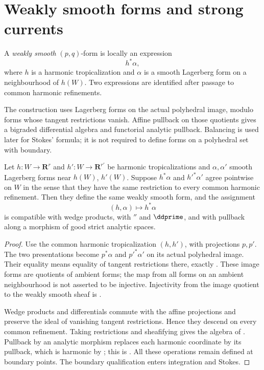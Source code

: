 \section{Weakly smooth forms and strong currents}
\label{sec:weak-smooth}

\begin{definition}
\label{def:ch18-weakly-smooth-form}
A \emph{weakly smooth} $(p,q)$-form is locally an expression
\[
                                h^*\alpha,
\]
where $h$ is a harmonic tropicalization and $\alpha$ is a smooth
Lagerberg form on a neighbourhood of $h(W)$.  Two expressions are
identified after passage to common harmonic refinements.
\end{definition}

The construction uses Lagerberg forms on the actual polyhedral image,
modulo forms whose tangent restrictions vanish.  Affine pullback on those
quotients gives a bigraded differential algebra and functorial analytic
pullback.  Balancing is used later for Stokes' formula; it is not required
to define forms on a polyhedral set with boundary.

\begin{proposition}
\label{prop:ch18-weakly-smooth-welldefined}
Let $h:W\to\mathbf R^r$ and $h':W\to\mathbf R^{r'}$ be harmonic
tropicalizations and $\alpha,\alpha'$ smooth Lagerberg forms near $h(W)$,
$h'(W)$.  Suppose $h^*\alpha$ and $h'^*\alpha'$ agree pointwise on $W$ in
the sense that they have the same restriction to every common harmonic
refinement.  Then they define the same weakly smooth form, and the
assignment
\[
 (h,\alpha)\longmapsto h^*\alpha
\]
is compatible with wedge products, with $\dprime$ and $\ddprime$, and with
pullback along a morphism of good strict analytic spaces.
\end{proposition}

\begin{proof}
Use the common harmonic tropicalization $(h,h')$, with projections $p,p'$.
The two presentations become $p^*\alpha$ and $p'^*\alpha'$ on its actual
polyhedral image.  Their equality means equality of tangent restrictions
there, exactly \cite[Definition~10.3]{GJR26}.  These image forms are
quotients of ambient forms; the map from all forms on an ambient
neighbourhood is not asserted to be injective.  Injectivity from the image
quotient to the weakly smooth sheaf is \cite[Proposition~10.9]{GJR26}.

Wedge products and differentials commute with the affine projections and
preserve the ideal of vanishing tangent restrictions.  Hence they descend
on every common refinement.  Taking restrictions and sheafifying gives the
algebra of \cite[\S10.6 and Definition~10.7]{GJR26}.  Pullback by an
analytic morphism replaces each harmonic coordinate by its pullback, which
is harmonic by ; this is
\cite[\S10.8]{GJR26}.  All these operations remain defined at boundary
points.  The boundary qualification enters integration and Stokes.
\end{proof}

